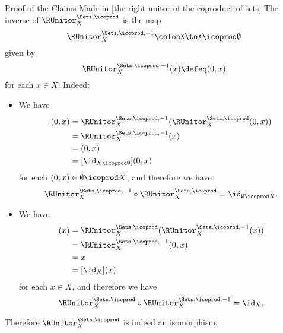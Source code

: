 \begin{Proof}{Proof of the Claims Made in \cref{the-right-unitor-of-the-coproduct-of-sets}}
    The inverse of $\RUnitor^{\Sets,\icoprod}_{X}$ is the map
    \[
        \RUnitor^{\Sets,\icoprod,-1}_{X}%
        \colon%
        X%
        \to%
        X\icoprod\emptyset%
    \]%
    given by
    \[
        \RUnitor^{\Sets,\icoprod,-1}_{X}(x)%
        \defeq%
        (0,x)%
    \]%
    for each $x\in X$. Indeed:
    \begin{itemize}
        \item{}We have
            \begin{align*}
                [\RUnitor^{\Sets,\icoprod,-1}_{X}\circ\RUnitor^{\Sets,\icoprod}_{X}](0,x) &= \RUnitor^{\Sets,\icoprod,-1}_{X}(\RUnitor^{\Sets,\icoprod}_{X}(0,x))\\
                                                                                          &= \RUnitor^{\Sets,\icoprod,-1}_{X}(x)\\
                                                                                          &= (0,x)\\
                                                                                          &= [\id_{ X\icoprod\emptyset}](0,x)
            \end{align*}
            for each $(0,x)\in\emptyset\icoprod X$, and therefore we have
            \[
                \RUnitor^{\Sets,\icoprod,-1}_{X}%
                \circ%
                \RUnitor^{\Sets,\icoprod}_{X}%
                =%
                \id_{\emptyset\icoprod X}.%
            \]%
        \item{}We have
            \begin{align*}
                [\RUnitor^{\Sets,\icoprod}_{X}\circ\RUnitor^{\Sets,\icoprod,-1}_{X}](x) &= \RUnitor^{\Sets,\icoprod}_{X}(\RUnitor^{\Sets,\icoprod,-1}_{X}(x))\\
                                                                                        &= \RUnitor^{\Sets,\icoprod,-1}_{X}(0,x)\\
                                                                                        &= x\\
                                                                                        &= [\id_{X}](x)
            \end{align*}
            for each $x\in X$, and therefore we have
            \[
                \RUnitor^{\Sets,\icoprod}_{X}%
                \circ%
                \RUnitor^{\Sets,\icoprod,-1}_{X}%
                =%
                \id_{X}.%
            \]%
    \end{itemize}
    Therefore $\RUnitor^{\Sets,\icoprod}_{X}$ is indeed an isomorphism.


\end{Proof}

